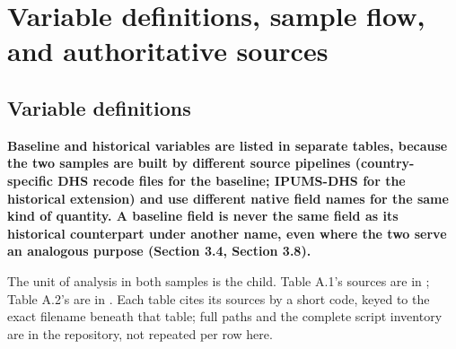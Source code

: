 
\section{Variable definitions, sample flow, and authoritative sources}\label{sec:A}

\subsection{Variable definitions}\label{sec:A.1}

\textbf{Baseline and historical variables are listed in separate tables, because the two samples are built by different source pipelines (country-specific DHS recode files for the baseline; IPUMS-DHS for the historical extension) and use different native field names for the same kind of quantity. A baseline field is never the same field as its historical counterpart under another name, even where the two serve an analogous purpose (Section 3.4, Section 3.8).}

The unit of analysis in both samples is the child. Table A.1's sources are in ; Table A.2's are in . Each table cites its sources by a short code, keyed to the exact filename beneath that table; full paths and the complete script inventory are in the repository, not repeated per row here.


